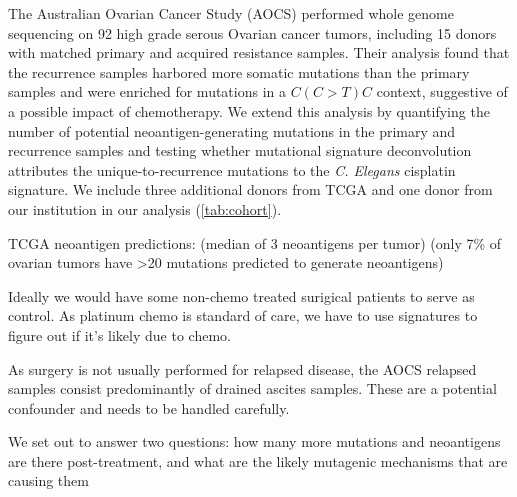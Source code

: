 The Australian Ovarian Cancer Study (AOCS)\cite{Patch_2015} performed whole genome sequencing on 92 high grade serous Ovarian cancer tumors, including 15 donors with matched primary and acquired resistance samples. Their analysis found that the recurrence samples harbored more somatic mutations than the primary samples and were enriched for mutations in a $C(C \gt T)C$ context, suggestive of a possible impact of chemotherapy. We extend this analysis by quantifying the number of potential neoantigen-generating mutations in the primary and recurrence samples and testing whether mutational signature deconvolution attributes the unique-to-recurrence mutations to the \textit{C. Elegans} cisplatin signature. We include three additional donors from TCGA and one donor from our institution in our analysis (\ref{tab:cohort}).

TCGA neoantigen predictions: \cite{Brown_2014} (median of 3 neoantigens per tumor) \cite{Rooney_2015} (only 7\% of ovarian tumors have >20 mutations predicted to generate neoantigens)

Ideally we would have some non-chemo treated surigical patients to serve as control. As platinum chemo is standard of care, we have to use signatures to figure out if it's likely due to chemo.

As surgery is not usually performed for relapsed disease, the AOCS relapsed samples consist predominantly of drained ascites samples. These are a potential confounder and needs to be handled carefully.

We set out to answer two questions: how many more mutations and neoantigens are there post-treatment, and what are the likely mutagenic mechanisms that are causing them